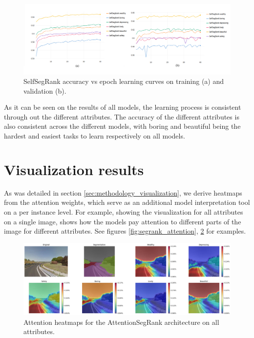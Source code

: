 \begin{figure}[ht]
	\begin{center}
	\includegraphics[width=1\textwidth]{./figures/selfsegrank_graph.png}
	\caption[SelfSegRank Training curves]{
        SelfSegRank accuracy vs epoch learning curves on training (a) and validation (b).
        }
	\label{fig:selfsegrank_graph}
	\end{center}
\end{figure}

As it can be seen on the results of all models, the learning process is consistent through out
the different attributes. The accuracy of the different attributes is also consistent across the
different models, with boring and beautiful being the hardest and easiest tasks to learn respectively
on all models.


\section{Visualization results}
\label{sec:visualization_results}

As was detailed in section \ref{sec:methodology_visualization}, we  derive heatmaps
from the attention weights, which serve as an additional model interpretation
tool on a per instance level. For example, showing the visualization for all attributes on
a single image, shows how the models pay attention to different parts of the image for different
attributes. See figures \ref{fig:segrank_attention}, \ref{fig:vis_sample} for examples.

\begin{figure}[ht]
	\begin{center}
	\includegraphics[width=1\textwidth]{./figures/vis_samples(seg_attn).png}
	\caption[Multi attribute Visualization Sample]{
        Attention heatmaps for the AttentionSegRank architecture on all attributes.
        }
	\label{fig:vis_sample}
	\end{center}
\end{figure}

